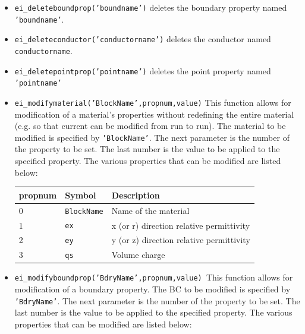 \begin{itemize}
\item {\tt ei\_deleteboundprop('boundname')} deletes the boundary property
named {\tt 'boundname'}.

\item \texttt{ei\_deleteconductor('conductorname')} deletes the conductor named
\texttt{conductorname}.

\item \texttt{ei\_deletepointprop('pointname')} deletes the point property named
\texttt{'pointname'}

\item \texttt{ei\_modifymaterial('BlockName',propnum,value)} This function allows for
modification of a material's properties without redefining the
entire material (e.g. so that current can be modified from run to
run). The material to be modified is specified by
\texttt{'BlockName'}. The next parameter is the number of the
property to be set. The last number is the value to be applied to
the specified property. The various properties that can be modified
are listed below:

\begin{tabular}{lll}
propnum & Symbol &  Description \\ \hline
 0 & \texttt{BlockName} & Name of the material \\
 1 & \texttt{ex} & x (or r) direction relative permittivity \\
 2 & \texttt{ey} & y (or z) direction relative permittivity \\
 3 & \texttt{qs} & Volume charge
\end{tabular}


\item \texttt{ei\_modifyboundprop('BdryName',propnum,value) }This function allows for
modification of a boundary property. The BC to be modified is specified by
\texttt{'BdryName'}. The next parameter is the number of the property to be
set. The last number is the value to be applied to the specified property.
The various properties that can be modified are listed below:


\end{itemize}
